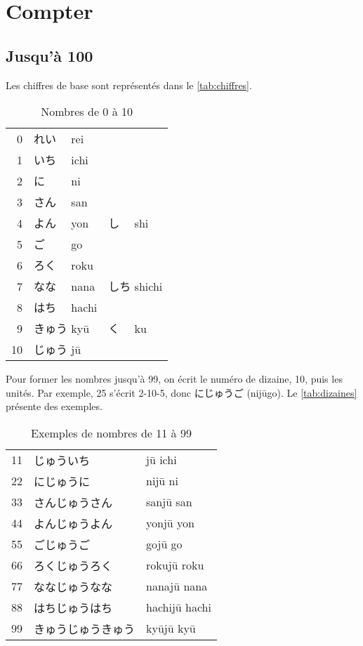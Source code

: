 \documentclass[a4paper,10pt,french,openany]{memoir}
\begin{document}
\chapter{Compter}
\section{Jusqu'à 100}

Les chiffres de base sont représentés dans le \autoref{tab:chiffres}.

\begin{table}[htbp]
 \centering
 \begin{tabular}{rll}
  0 & れい　 rei\\
  1 & いち　 ichi\\
  2 & に　　 ni\\
  3 & さん　 san\\
  4 & よん　 yon & し　 shi\\
  5 & ご　　 go\\
  6 & ろく　 roku\\
  7 & なな　 nana & しち shichi\\
  8 & はち　 hachi\\
  9 & きゅう kyū & く　 ku\\
 10 & じゅう jū
 \end{tabular}
 \caption{Nombres de 0 à 10}
 \label{tab:chiffres}
\end{table}

Pour former les nombres jusqu'à 99, on écrit le numéro de dizaine, 10, puis les unités. Par exemple, 25 s'écrit 2-10-5, donc にじゅうご (nijūgo). Le \autoref{tab:dizaines} présente des exemples.

\begin{table}[htbp]
 \centering
 \begin{tabular}{cll}
  11 & じゅういち      &jū ichi\\
  22 & にじゅうに      &nijū ni\\
  33 & さんじゅうさん   &sanjū san\\
  44 & よんじゅうよん   &yonjū yon\\
  55 & ごじゅうご      &gojū go\\
  66 & ろくじゅうろく   &rokujū roku\\
  77 & ななじゅうなな   &nanajū nana\\
  88 & はちじゅうはち   &hachijū hachi\\
  99 & きゅうじゅうきゅう&kyūjū kyū\\
 \end{tabular}
 \caption{Exemples de nombres de 11 à 99}
 \label{tab:dizaines}
\end{table}
\end{document}
